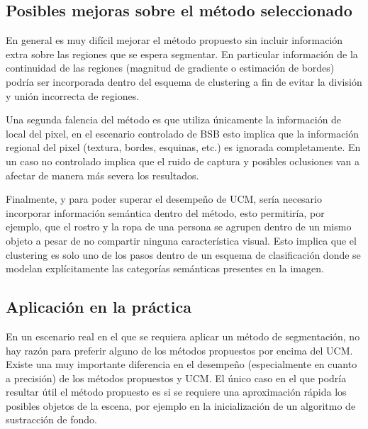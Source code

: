 \documentclass[10pt,twocolumn,letterpaper]{article}
\begin{document}
\subsection{Posibles mejoras sobre el método seleccionado}
En general es muy difícil mejorar el método propuesto sin incluir información extra sobre las regiones que se espera segmentar. En particular información de la continuidad de las regiones (magnitud de gradiente o estimación de bordes) podría ser incorporada dentro del esquema de clustering a fin de evitar la división y unión incorrecta de regiones.

Una segunda falencia del método es que utiliza únicamente la información de local del pixel, en el escenario controlado de BSB esto implica que la información regional del pixel (textura, bordes, esquinas, etc.) es ignorada completamente. En un caso no controlado implica que el ruido de captura y posibles oclusiones van a afectar de manera más severa los resultados.

Finalmente, y para poder superar el desempeño de UCM, sería necesario incorporar información semántica dentro del método, esto permitiría, por ejemplo, que  el rostro y la ropa de una persona se agrupen dentro de un mismo objeto a pesar de no compartir ninguna característica visual. Esto implica que el clustering es solo uno de los pasos dentro de un esquema de clasificación donde se modelan explícitamente las categorías semánticas presentes en la imagen.


\subsection{Aplicación en la práctica}
En un escenario real en el que se requiera aplicar un método de segmentación, no hay razón para preferir alguno de los métodos propuestos por encima del UCM. Existe una muy importante diferencia en el desempeño (especialmente en cuanto a precisión) de los métodos propuestos y UCM. El único caso en el que podría resultar útil el método propuesto es si se requiere una aproximación rápida los posibles objetos de la escena, por ejemplo en la inicialización de un algoritmo de sustracción de fondo.


{\small


}
\end{document}
